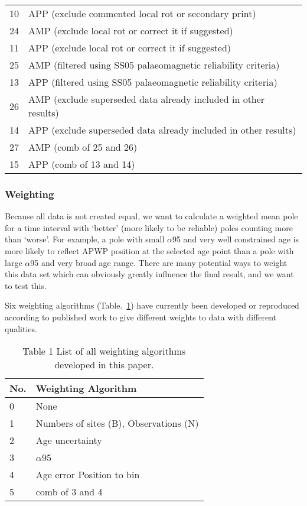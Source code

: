 \begin{table}
\begin{tabular}{@{}ll@{}}
10 & APP (exclude commented local rot or secondary print) \\
24 & AMP (exclude local rot or correct it if suggested) \\
11 & APP (exclude local rot or correct it if suggested) \\
25 & AMP (filtered using SS05 palaeomagnetic reliability criteria) \\
13 & APP (filtered using SS05 palaeomagnetic reliability criteria) \\
26 & AMP (exclude superseded data already included in other results) \\
14 & APP (exclude superseded data already included in other results) \\
27 & AMP (comb of 25 and 26) \\
15 & APP (comb of 13 and 14) \\ \bottomrule
\end{tabular}
\end{table}

\subsubsection{Weighting}

Because all data is not created equal, we want to calculate a weighted mean
pole for a time interval with `better' (more likely to be reliable) poles
counting more than `worse'. For example, a pole with small $\alpha$95
and very well constrained age is more likely to reflect APWP position at the
selected age point than a pole with large $\alpha$95 and very broad age
range. There are many potential ways to weight this data set which can
obviously greatly influence the final result, and we want to test this.

Six weighting algorithms (Table.~\ref{tab-weit}) have currently been developed
or reproduced according to published work to give different weights to data with
different qualities.

\begin{table}
\centering
\caption{Table 1 List of all weighting algorithms developed in this
         paper.}\label{tab-weit}
\begin{tabular}{@{}ll@{}}
\toprule
No. & Weighting Algorithm \\ \midrule
0 & None \\
1 & Numbers of sites (B), Observations (N) \\
2 & Age uncertainty \\
3 & $\alpha$95 \\
4 & Age error Position to bin \\
5 & comb of 3 and 4 \\ \bottomrule
\end{tabular}
\end{table}

